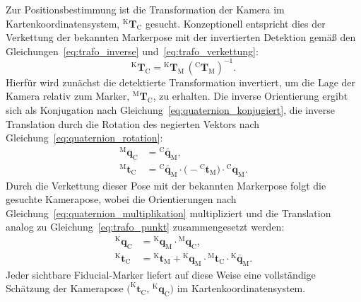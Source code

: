 Zur Positionsbestimmung ist die Transformation der Kamera im Kartenkoordinatensystem, $^{\mathrm{K}}\mathbf{T}_{\mathrm{C}}$ gesucht.
Konzeptionell entspricht dies der Verkettung der bekannten Markerpose mit der invertierten Detektion gemäß den
Gleichungen~\ref{eq:trafo_inverse} und~\ref{eq:trafo_verkettung}:
\begin{equation}
^{\mathrm{K}}\mathbf{T}_{\mathrm{C}} = {^{\mathrm{K}}\mathbf{T}_{\mathrm{M}}}\,\left(^{\mathrm{C}}\mathbf{T}_{\mathrm{M}}\right)^{-1}.
\label{eq:pos_kamera_in_karte}
\end{equation}
Hierfür wird zunächst die detektierte Transformation invertiert, um die Lage der Kamera relativ zum Marker, $^{\mathrm{M}}\mathbf{T}_{\mathrm{C}}$, zu erhalten.
Die inverse Orientierung ergibt sich als Konjugation nach Gleichung~\ref{eq:quaternion_konjugiert}, die inverse Translation durch die Rotation
des negierten Vektors nach Gleichung~\ref{eq:quaternion_rotation}:
\begin{align}
^{\mathrm{M}}\mathbf{q}_{\mathrm{C}} &= {^{\mathrm{C}}\bar{\mathbf{q}}_{\mathrm{M}}}, \label{eq:pos_inverse_q}\\
^{\mathrm{M}}\mathbf{t}_{\mathrm{C}} &= {^{\mathrm{C}}\bar{\mathbf{q}}_{\mathrm{M}}} \cdot \bigl(-{^{\mathrm{C}}\mathbf{t}_{\mathrm{M}}}\bigr) \cdot {^{\mathrm{C}}\mathbf{q}_{\mathrm{M}}}. \label{eq:pos_inverse_t}
\end{align}
Durch die Verkettung dieser Pose mit der bekannten Markerpose folgt die gesuchte Kamerapose, 
wobei die Orientierungen nach Gleichung~\ref{eq:quaternion_multiplikation} multipliziert und die Translation analog zu Gleichung~\ref{eq:trafo_punkt} zusammengesetzt werden:
\begin{align}
^{\mathrm{K}}\mathbf{q}_{\mathrm{C}} &= {^{\mathrm{K}}\mathbf{q}_{\mathrm{M}}} \cdot {^{\mathrm{M}}\mathbf{q}_{\mathrm{C}}}, \label{eq:pos_kompose_q}\\
^{\mathrm{K}}\mathbf{t}_{\mathrm{C}} &= {^{\mathrm{K}}\mathbf{t}_{\mathrm{M}}} + {^{\mathrm{K}}\mathbf{q}_{\mathrm{M}}} \cdot {^{\mathrm{M}}\mathbf{t}_{\mathrm{C}}} \cdot {^{\mathrm{K}}\bar{\mathbf{q}}_{\mathrm{M}}}. \label{eq:pos_kompose_t}
\end{align}
Jeder sichtbare Fiducial-Marker liefert auf diese Weise eine vollständige Schätzung der Kamerapose $\bigl(^{\mathrm{K}}\mathbf{t}_{\mathrm{C}},\,{^{\mathrm{K}}\mathbf{q}_{\mathrm{C}}}\bigr)$
im Kartenkoordinatensystem.


